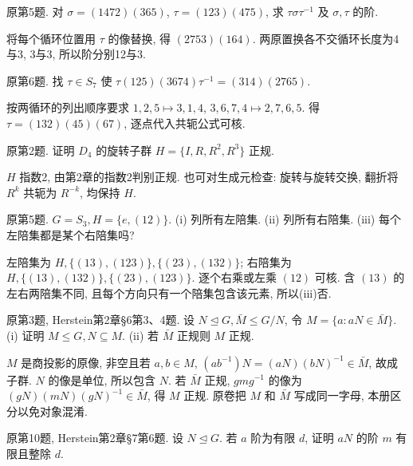 \begin{exercise}原第5题. 对 $\sigma=(1472)(365)$, $\tau=(123)(475)$, 求 $\tau\sigma\tau^{-1}$ 及 $\sigma,\tau$ 的阶.\end{exercise}
\begin{solution}
将每个循环位置用 $\tau$ 的像替换, 得 $(2753)(164)$. 两原置换各不交循环长度为4与3, 3与3, 所以阶分别12与3.
\end{solution}
\begin{exercise}原第6题. 找 $\tau\in S_7$ 使 $\tau(125)(3674)\tau^{-1}=(314)(2765)$.\end{exercise}
\begin{solution}
按两循环的列出顺序要求 $1,2,5\mapsto3,1,4$, $3,6,7,4\mapsto2,7,6,5$. 得 $\tau=(132)(45)(67)$, 逐点代入共轭公式可核.
\end{solution}
\begin{exercise}原第2题. 证明 $D_4$ 的旋转子群 $H=\{I,R,R^2,R^3\}$ 正规.\end{exercise}
\begin{solution}
$H$ 指数2, 由第2章的指数2判别正规. 也可对生成元检查: 旋转与旋转交换, 翻折将 $R^k$ 共轭为 $R^{-k}$, 均保持 $H$.
\end{solution}
\begin{exercise}原第5题. $G=S_3,H=\{e,(12)\}$. (i) 列所有左陪集. (ii) 列所有右陪集. (iii) 每个左陪集都是某个右陪集吗?\end{exercise}
\begin{solution}
左陪集为 $H,\{(13),(123)\},\{(23),(132)\}$; 右陪集为 $H,\{(13),(132)\},\{(23),(123)\}$. 逐个右乘或左乘 $(12)$ 可核. 含 $(13)$ 的左右两陪集不同, 且每个方向只有一个陪集包含该元素, 所以(iii)否.
\end{solution}
\begin{exercise}原第3题, Herstein第2章\S6第3、4题. 设 $N\trianglelefteq G,\bar M\le G/N$, 令 $M=\{a:aN\in\bar M\}$. (i) 证明 $M\le G,N\subseteq M$. (ii) 若 $\bar M$ 正规则 $M$ 正规.\end{exercise}
\begin{solution}
$M$ 是商投影的原像, 非空且若 $a,b\in M$, $(ab^{-1})N=(aN)(bN)^{-1}\in\bar M$, 故成子群. $N$ 的像是单位, 所以包含 $N$. 若 $\bar M$ 正规, $gmg^{-1}$ 的像为 $(gN)(mN)(gN)^{-1}\in\bar M$, 得 $M$ 正规. 原卷把 $M$ 和 $\bar M$ 写成同一字母, 本册区分以免对象混淆.
\end{solution}
\begin{exercise}原第10题, Herstein第2章\S7第6题. 设 $N\trianglelefteq G$. 若 $a$ 阶为有限 $d$, 证明 $aN$ 的阶 $m$ 有限且整除 $d$.\end{exercise}
